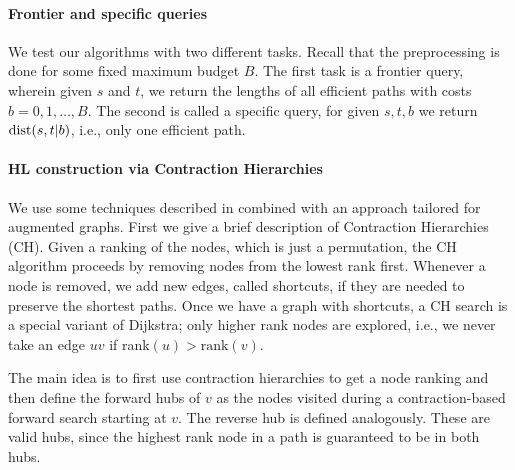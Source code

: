 \paragraph{Frontier and specific queries}
We test our algorithms with two different tasks.
Recall that the preprocessing is done for some fixed maximum budget $B$.
The first task is a frontier query, wherein given $s$ and $t$, we return the lengths of all efficient paths with costs $b=0,1,\ldots,B$.
The second is called a specific query, for given $s,t,b$ we return $\mbox{dist}(s,t|b)$, i.e., only one efficient path.
%
%

\paragraph{HL construction via Contraction Hierarchies}
We use some techniques described in \cite{hubimplem} combined with an approach tailored for augmented graphs.
First we give a brief description of Contraction Hierarchies (CH).
Given a ranking of the nodes, which is just a permutation, the CH algorithm proceeds by removing nodes from the lowest rank first.
Whenever a node is removed, we add new edges, called shortcuts, if they are needed to preserve the shortest paths.
Once we have a graph with shortcuts, a CH search is a special variant of Dijkstra; only higher rank nodes are explored, i.e., we never take an edge $uv$ if rank$(u)>\text{rank}(v)$. 

The main idea is to first use contraction hierarchies to get a node ranking and then define the forward hubs of $v$ as the nodes visited during a contraction-based forward search starting at $v$.
The reverse hub is defined analogously.
These are valid hubs, since the highest rank node in a path is guaranteed to be in both hubs.

